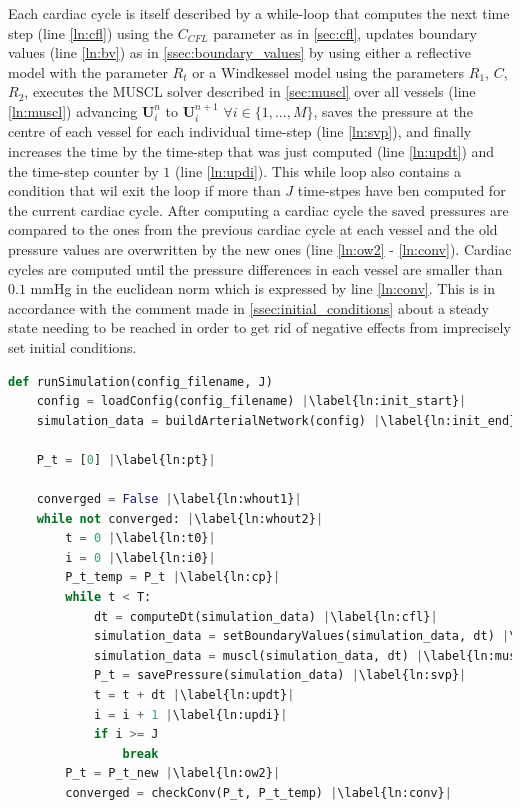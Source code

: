 \documentclass[a4paper, oneside]{discothesis}
\begin{document}
							Each cardiac cycle is itself described by a while-loop that computes the next time step (line \ref{ln:cfl}) using the $C_{CFL}$ parameter as in \autoref{sec:cfl}, updates boundary values (line \ref{ln:bv}) as in \autoref{ssec:boundary_values} by using either a reflective model with the parameter $R_t$ or a Windkessel model using the parameters $R_1$, $C$, $R_2$, executes the MUSCL solver described in \autoref{sec:muscl} over all vessels (line \ref{ln:muscl}) advancing $\mathbf{U}_i^{n}$ to $\mathbf{U}_i^{n+1}$ $\forall i \in \{1,...,M\}$, saves the pressure at the centre of each vessel for each individual time-step (line \ref{ln:svp}), and finally increases the time by the time-step that was just computed (line \ref{ln:updt}) and the time-step counter by $1$ (line \ref{ln:updi}).
							This while loop also contains a condition that wil exit the loop if more than $J$ time-stpes have ben computed for the current cardiac cycle.
							After computing a cardiac cycle the saved pressures are compared to the ones from the previous cardiac cycle at each vessel and the old pressure values are overwritten by the new ones (line \ref{ln:ow2} - \ref{ln:conv}).
							Cardiac cycles are computed until the pressure differences in each vessel are smaller than $0.1$ mmHg in the euclidean norm which is expressed by line \ref{ln:conv}.
							This is in accordance with the comment made in \autoref{ssec:initial_conditions} about a steady state needing to be reached in order to get rid of negative effects from imprecisely set initial conditions.
\begin{lstlisting}[language=Python, caption=code structure in pseudocode, label=lst:pc, escapechar=|]
def runSimulation(config_filename, J)
	config = loadConfig(config_filename) |\label{ln:init_start}|
	simulation_data = buildArterialNetwork(config) |\label{ln:init_end}|

	P_t = [0] |\label{ln:pt}|

	converged = False |\label{ln:whout1}|
	while not converged: |\label{ln:whout2}|
		t = 0 |\label{ln:t0}|
		i = 0 |\label{ln:i0}|
		P_t_temp = P_t |\label{ln:cp}|
		while t < T:
			dt = computeDt(simulation_data) |\label{ln:cfl}|
			simulation_data = setBoundaryValues(simulation_data, dt) |\label{ln:bv}|
			simulation_data = muscl(simulation_data, dt) |\label{ln:muscl}|
			P_t = savePressure(simulation_data) |\label{ln:svp}|
			t = t + dt |\label{ln:updt}|
			i = i + 1 |\label{ln:updi}|
			if i >= J
				break
		P_t = P_t_new |\label{ln:ow2}|
		converged = checkConv(P_t, P_t_temp) |\label{ln:conv}|
						\end{lstlisting}
\end{document}
